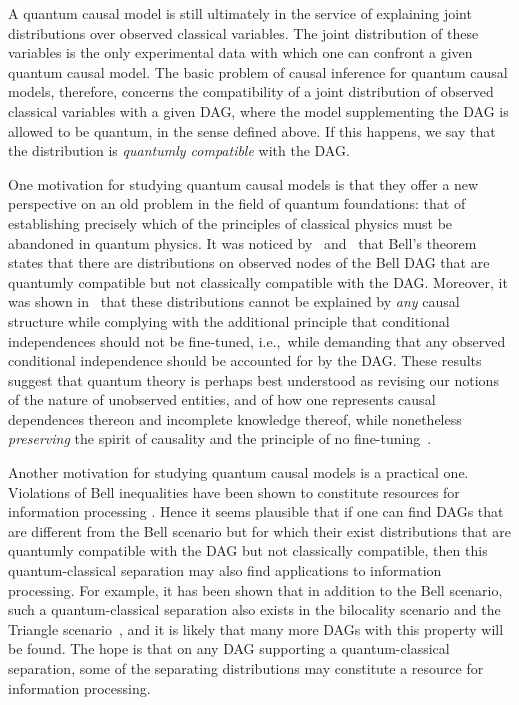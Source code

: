 \documentclass[aps,english,superscriptaddress,onecolumn,twoside,longbibliography,pra,floatfix,fleqn,nofootinbib]{revtex4-1}%
\theoremstyle{definition}
\newcounter{example}[section]
\begin{document}
A quantum causal model is still ultimately in the service of explaining joint distributions over observed classical variables. The joint distribution of these variables is the only experimental data with which one can confront a given quantum causal model. The basic problem of causal inference for quantum causal models, therefore, concerns the compatibility of a joint distribution of observed classical variables with a given DAG, where the model supplementing the DAG is allowed to be quantum, in the sense defined above. If this happens, we say that the distribution is {\em quantumly compatible} with the DAG.  
 

One motivation for studying quantum causal models is that they offer a new perspective on an old  problem in the field of quantum foundations: that of establishing precisely which of the principles of classical physics must be abandoned in quantum physics. It was noticed by~\citet{fritz2012bell} and~\citet{WoodSpekkens} that Bell's theorem~\cite{bell1966lhvm} states that there are distributions on observed nodes of the Bell DAG that are quantumly compatible but not classically compatible with the DAG. Moreover, it was shown in~\cite{WoodSpekkens} that these distributions cannot be explained by \emph{any} causal structure while complying with the additional principle that conditional independences should not be fine-tuned, i.e.,~while demanding that any observed conditional independence should be accounted for by the DAG. These results suggest that quantum theory is perhaps best understood as revising our notions of the nature of unobserved entities, and of how one represents causal dependences thereon and incomplete knowledge thereof, while 
nonetheless {\em preserving} the spirit of causality and the principle of no fine-tuning~\cite{leifer2013conditionalstates,Spekkens2015paradigm,henson2011ontic}.

Another motivation for studying quantum causal models is a practical one.  Violations of Bell inequalities have  been shown to constitute resources for information processing \cite{NoSigPolytope,scarani2012device,BancalDIApproach}. Hence it seems plausible that if one can find DAGs that are different from the Bell scenario but for which their exist distributions that are quantumly compatible with the DAG but not classically compatible, then this quantum-classical separation may also find applications to information processing. 
For example, it has been shown that in addition to the Bell scenario, such a quantum-classical separation also exists 
in the bilocality scenario \cite{BilocalCorrelations} and the Triangle scenario~\cite{fritz2012bell}, and it is likely that many more DAGs with this property will be found.  The hope is that on any DAG supporting a quantum-classical separation, some of the separating distributions may constitute a resource for information processing. 
\end{document}
